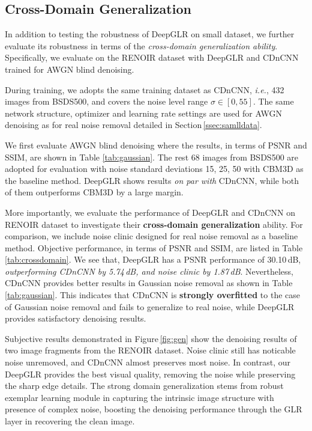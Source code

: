 \documentclass[10pt,twocolumn,letterpaper]{article}
\begin{document}
\subsection{Cross-Domain Generalization}
\label{ssub:cross}
In addition to testing the robustness of DeepGLR on small dataset, we further evaluate its robustness in terms of the \emph{cross-domain generalization ability}. 
Specifically, we evaluate on the RENOIR dataset with DeepGLR and CDnCNN trained for AWGN blind denoising. 

During training, we adopts the same training dataset as CDnCNN, \textit{i.e.}, 432 images from BSDS500, and covers the noise level range $\sigma \in [0,55]$. The same network structure, optimizer and learning rate settings are used for AWGN denoising as for real noise removal detailed in Section\,\ref{ssec:samlldata}.

We first evaluate AWGN blind denoising where the results, in terms of PSNR and SSIM, are shown in Table \ref{tab:gaussian}. 
The rest 68 images from BSDS500 are adopted for evaluation with noise standard deviations 15, 25, 50 with CBM3D as the baseline method. DeepGLR shows results \emph{on par with} CDnCNN, while both of them outperforms CBM3D by a large margin.


More importantly, we evaluate the performance of DeepGLR and CDnCNN on RENOIR dataset to investigate their \textbf{cross-domain generalization} ability.
For comparison, we include noise clinic \cite{lebrun2015noise} designed for real noise removal as a baseline method. 
Objective performance, in terms of PSNR and SSIM, are listed in Table\,\ref{tab:crossdomain}.
We see that, DeepGLR has a PSNR performance of 30.10\,dB, \textit{outperforming CDnCNN by 5.74\,dB, and noise clinic by 1.87\,dB}. 
Nevertheless, CDnCNN provides better results in Gaussian noise removal as shown in Table \ref{tab:gaussian}.
This indicates that CDnCNN is \textbf{strongly overfitted} to the case of Gaussian noise removal and fails to generalize to real noise, while DeepGLR provides satisfactory denoising results.

Subjective results demonstrated in Figure\,\ref{fig:gen} show the denoising results of two image fragments from the RENOIR dataset. Noise clinic still has noticable noise unremoved, and CDnCNN almost preserves most noise. 
In contrast, our DeepGLR provides the best visual quality, removing the noise while preserving the sharp edge details. 
The strong domain generalization stems from robust exemplar learning module in capturing the intrinsic image structure with presence of complex noise, boosting the denoising performance through the GLR layer in recovering the clean image.
\end{document}
